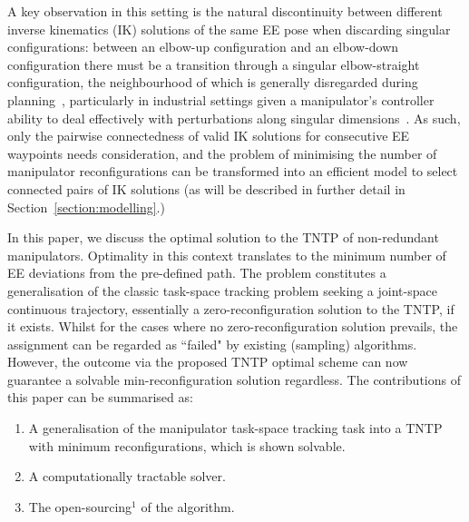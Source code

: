 \documentclass[letterpaper, 10 pt, journal, twoside]{ieeetran}  %
\begin{document}
A key observation in this setting is the natural discontinuity between different inverse kinematics (IK) solutions of the same EE pose when discarding singular configurations: between an 
elbow-up configuration and an elbow-down configuration there must be a transition through a singular elbow-straight configuration, the neighbourhood of which is generally 
disregarded during planning~\cite{Mayorga1988Singularities}, particularly in industrial settings given a manipulator's controller ability to deal effectively with perturbations along singular dimensions~\cite{Xu2015Singularity}. 
As such, only the pairwise connectedness of valid IK solutions for consecutive EE waypoints needs consideration, and the problem of minimising the number of manipulator 
reconfigurations can be transformed into an efficient model to select connected pairs of IK solutions (as will be described in further detail in Section~\ref{section:modelling}.) 

In this paper, we discuss the optimal solution to the TNTP of non-redundant manipulators. Optimality in this context translates to the minimum number of EE deviations from the pre-defined path. The problem constitutes a generalisation of the classic task-space tracking problem seeking a joint-space continuous trajectory, essentially a zero-reconfiguration solution to the TNTP, if it exists. Whilst for the cases where no zero-reconfiguration solution prevails, the assignment can be regarded as ``failed" by existing (sampling) algorithms. However, the outcome via the proposed TNTP optimal scheme can now guarantee a solvable min-reconfiguration solution regardless. The contributions of this paper can be summarised as: 
\begin{enumerate}
\item A generalisation of the manipulator task-space tracking task into a TNTP with minimum reconfigurations, which is shown solvable. 
\item A computationally tractable solver. 
\item The open-sourcing$^1$ of the algorithm.
\end{enumerate}
\end{document}
